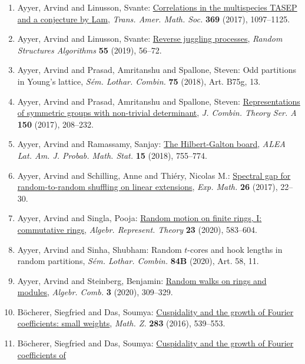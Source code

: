 \begin{enumerate}
{polytopes}, \emph{Ann. H. Lebesgue} {\bf 3} (2020), 275--297.
\item Ayyer, Arvind and Linusson, Svante: \href{https://doi.org/10.1090/tran/6806}{Correlations in the multispecies {TASEP} and a conjecture by
{L}am}, \emph{Trans. Amer. Math. Soc.} {\bf 369} (2017), 1097--1125.
\item Ayyer, Arvind and Linusson, Svante: \href{https://doi.org/10.1002/rsa.20825}{Reverse juggling processes}, \emph{Random Structures Algorithms} {\bf 55} (2019), 56--72.
\item Ayyer, Arvind and Prasad, Amritanshu and Spallone, Steven: Odd partitions in {Y}oung's lattice, \emph{S\'{e}m. Lothar. Combin.} {\bf 75} (2018), Art. B75g, 13.
\item Ayyer, Arvind and Prasad, Amritanshu and Spallone, Steven: \href{https://doi.org/10.1016/j.jcta.2017.03.004}{Representations of symmetric groups with non-trivial
determinant}, \emph{J. Combin. Theory Ser. A} {\bf 150} (2017), 208--232.
\item Ayyer, Arvind and Ramassamy, Sanjay: \href{https://doi.org/10.30757/alea.v15-28}{The {H}ilbert-{G}alton board}, \emph{ALEA Lat. Am. J. Probab. Math. Stat.} {\bf 15} (2018), 755--774.
\item Ayyer, Arvind and Schilling, Anne and Thi\'{e}ry, Nicolas M.: \href{https://doi.org/10.1080/10586458.2015.1107868}{Spectral gap for random-to-random shuffling on linear
extensions}, \emph{Exp. Math.} {\bf 26} (2017), 22--30.
\item Ayyer, Arvind and Singla, Pooja: \href{https://doi.org/10.1007/s10468-019-09864-w}{Random motion on finite rings, {I}: commutative rings}, \emph{Algebr. Represent. Theory} {\bf 23} (2020), 583--604.
\item Ayyer, Arvind and Sinha, Shubham: Random {$t$}-cores and hook lengths in random partitions, \emph{S\'{e}m. Lothar. Combin.} {\bf 84B} (2020), Art. 58, 11.
\item Ayyer, Arvind and Steinberg, Benjamin: \href{https://doi.org/10.5802/alco.94}{Random walks on rings and modules}, \emph{Algebr. Comb.} {\bf 3} (2020), 309--329.
\item B\"{o}cherer, Siegfried and Das, Soumya: \href{https://doi.org/10.1007/s00209-015-1609-2}{Cuspidality and the growth of {F}ourier coefficients: small
weights}, \emph{Math. Z.} {\bf 283} (2016), 539--553.
\item B\"{o}cherer, Siegfried and Das, Soumya: \href{https://doi.org/10.1515/crelle-2015-0075}{Cuspidality and the growth of {F}ourier coefficients of
}
\end{enumerate}
